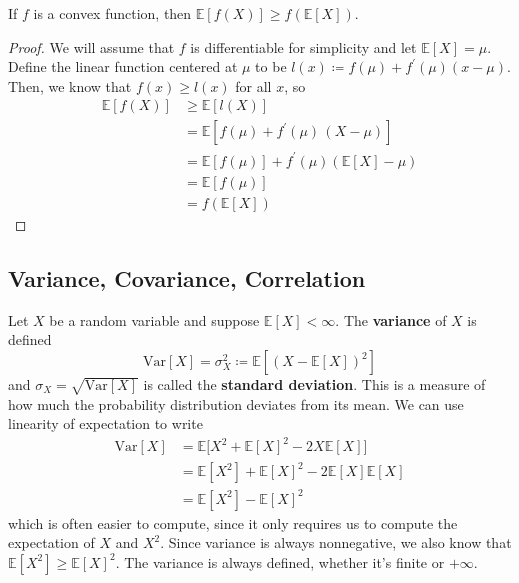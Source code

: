 \documentclass{article}
\begin{document}
      \begin{theorem}
        If $f$ is a convex function, then $\mathbb{E}[f(X)] \geq f (\mathbb{E}[X])$. 
      \end{theorem}
      \begin{proof}
        We will assume that $f$ is differentiable for simplicity and let $\mathbb{E}[X] = \mu$. Define the linear function centered at $\mu$ to be $l(x) \coloneqq f(\mu) + f^\prime (\mu) (x - \mu)$. Then, we know that $f(x) \geq l(x)$ for all $x$, so 
        \begin{align*}
          \mathbb{E}[f(X)] & \geq \mathbb{E}[ l(X)] \\ 
          & = \mathbb{E}[f(\mu) + f^\prime (\mu) \, (X - \mu)] \\
          & = \mathbb{E}[f(\mu)] + f^\prime (\mu) ( \mathbb{E}[X] - \mu) \\
          & = \mathbb{E}[f(\mu)] \\
          & = f(\mathbb{E}[X])
        \end{align*}
      \end{proof}

  \subsection{Variance, Covariance, Correlation}

    \begin{definition}[Variance]
      Let $X$ be a random variable and suppose $\mathbb{E}[X] < \infty$. The \textbf{variance} of $X$ is defined 
      \begin{equation}
        \mathrm{Var}[X] = \sigma^2_X \coloneqq \mathbb{E} [ (X - \mathbb{E}[X])^2 ]
      \end{equation}
      and $\sigma_X = \sqrt{\mathrm{Var}[X]}$ is called the \textbf{standard deviation}. This is a measure of how much the probability distribution deviates from its mean. We can use linearity of expectation to write 
      \begin{align*}
        \mathrm{Var}[X] & = \mathbb{E} \big[ X^2 + \mathbb{E}[X]^2 - 2 X \mathbb{E}[X] \big] \\
        & = \mathbb{E}[X^2] + \mathbb{E}[X]^2 - 2 \mathbb{E}[X] \mathbb{E}[X] \\
        & = \mathbb{E}[X^2] - \mathbb{E}[X]^2
      \end{align*}
      which is often easier to compute, since it only requires us to compute the expectation of $X$ and $X^2$. Since variance is always nonnegative, we also know that $\mathbb{E}[X^2] \geq \mathbb{E}[X]^2$. The variance is always defined, whether it's finite or $+\infty$. 
    \end{definition}
\end{document}
